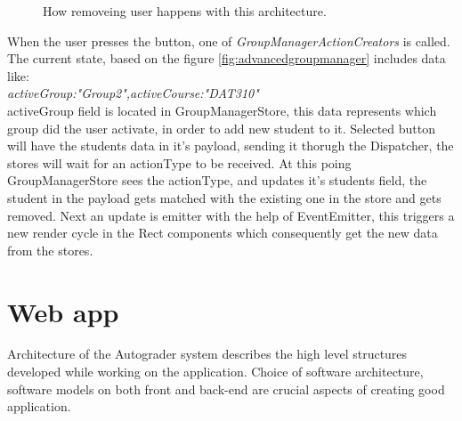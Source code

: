 \begin{figure}[h]
  \scalebox{0.8}{}
  \caption{How removeing user happens with this architecture.}
  \label{fig:advancedfluxaddstudent}
\end{figure}

When the user presses the button, one of \emph{GroupManagerActionCreators} is called. The current state, based on the figure \ref{fig:advancedgroupmanager} includes data like:
\\\emph{activeGroup:"Group2",activeCourse:"DAT310" }\\
activeGroup field is located in GroupManagerStore, this data represents which group did the user activate, in order to add new student to it. Selected button will have the students data in it's payload, sending it thorugh the Dispatcher, the stores will wait for an actionType to be received. At this poing GroupManagerStore sees the actionType, and updates it's students field, the student in the payload gets matched with the existing one in the store and gets removed. Next an update is emitter with the help of EventEmitter, this triggers a new render cycle in the Rect components which consequently get the new data from the stores.

\section{Web app}
Architecture of the Autograder system describes the high level structures developed while working on the application. Choice of software architecture, software models on both front and back-end are crucial aspects of creating good application.
